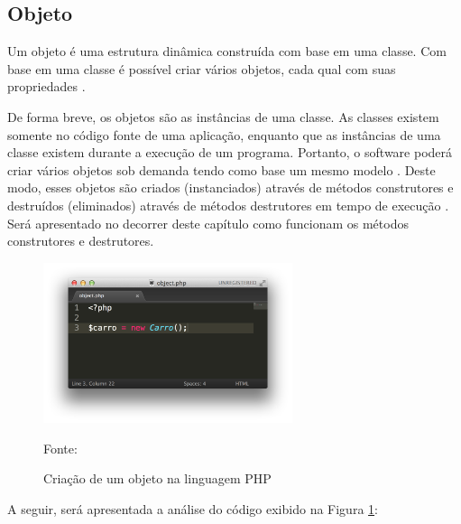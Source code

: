 \subsection{Objeto}

Um objeto é uma estrutura dinâmica construída com base em uma classe. Com base 
em uma classe é possível criar vários objetos, cada qual com suas propriedades 
\cite{phpProgramandoComOrientacaoAObjetos}.

De forma breve, os objetos são as instâncias de uma classe. As
classes existem somente no código fonte de uma aplicação, enquanto que as
instâncias de uma classe existem durante a execução de um programa. Portanto,
o software poderá criar vários objetos sob demanda tendo como base um mesmo
modelo \cite{ios7ProgrammingFundamentalsObjectiveCXcodeAndCocoaBasics}. Deste
modo, esses objetos são criados (instanciados) através de métodos construtores
e destruídos (eliminados) através de métodos destrutores em tempo de execução
\cite{umlEC++GuiaPraticoDeDesenvolvimentoOrientadoAObjeto}. Será apresentado no
decorrer deste capítulo como funcionam os métodos construtores e destrutores.

\begin{figure}[h!tb]
	\caption{Criação de um objeto na linguagem PHP}
	\label{fig:objeto}

	\centering
	\includegraphics[width=0.65\textwidth]{images/object.png}

	\centering
	\footnotesize Fonte: \fonteOAutor
\end{figure}

\FloatBarrier 	%

A seguir, será apresentada a análise do código exibido na
Figura \ref{fig:objeto}:


